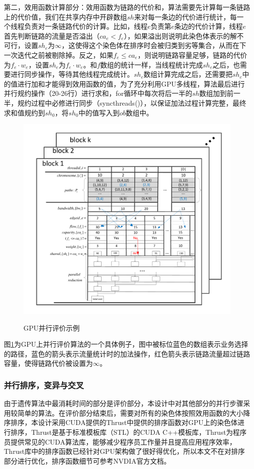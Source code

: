 第二，效用函数计算部分：效用函数为链路的代价和，算法需要先计算每一条链路上的代价值，我们在共享内存中开辟数组$sh$来对每一条边的代价进行统计，每一个线程负责对一条链路代价的计算。比如，线程$e$负责第$e$条边的代价计算，线程$e$首先判断链路的流量是否溢出（$ca_e<f_e$），如果溢出则说明此染色体表示的解不可行，设置$sh_e$为$\infty$，这使得这个染色体在排序时会被归类到劣等集合，从而在下一次迭代之前被剔除掉。反之，如果$f_e \le ca_e$，则说明链路容量足够，链路的代价为$f_e \cdot w_e$，设置$sh_e$为$f_e \cdot w_e$。和$f$数组的统计一样，当线程统计完成$sh_e$之后，也需要进行同步操作，等待其他线程完成统计。$sh_e$数组计算完成之后，还需要把$sh_e$中的值进行加和才能得到效用函数的值，为了充分利用GPU多线程，算法最后进行并行规约操作（20-26行）进行求和，for循环中每次将后一半的$sh$数组加到前一半，规约过程中必修进行同步（syncthreads()），以保证加法过程计算完整，最终求和值规约到$sh_0$，将$sh_0$中的值写入到$ob$数组中。
\begin{figure}
\begin{center}
{\includegraphics[width=1 \textwidth]{figures/GPUfitness.pdf}}
\end{center}
\caption{{\footnotesize{GPU并行评价示例}}}
\label{fitness}
\end{figure}

图\ref{fitness}为GPU上并行评价算法的一个具体例子，图中被标位蓝色的数组表示业务选择的路径，蓝色的箭头表示流量统计时的加法操作，红色箭头表示链路流量超过链路容量，使得链路代价被设置为$\infty$。
\subsubsection{并行排序，变异与交叉}
由于遗传算法中最消耗时间的部分是评价部分，本设计中对其他部分的并行步骤采用较简单的算法。在评价部分结束后，需要对所有的染色体按照效用函数的大小降序排序，本设计采用CUDA提供的Thrust中提供的排序函数对GPU上的染色体进行排序，Thrust是基于标准模板库（STL）的CUDA C++模板库，Thrust为程序员提供常见的CUDA算法库，能够减少程序员工作量并且提高应用程序效率，Thrust库中的排序函数已经针对GPU架构做了很好得优化，所以本文不在对排序部分进行优化，排序函数细节可参考NVDIA官方文档。

